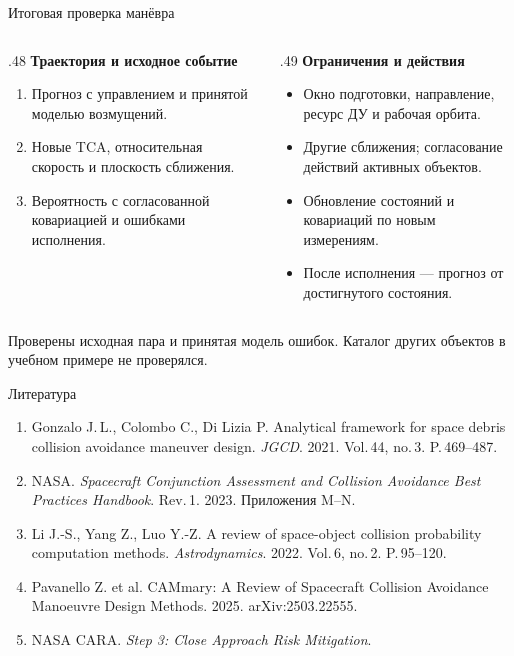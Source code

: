 \documentclass[11pt,aspectratio=169,t]{beamer}
\newcommand{\derivationmathspacing}{%
  \setlength{\abovedisplayskip}{2pt}%
  \setlength{\belowdisplayskip}{3pt}%
  \setlength{\abovedisplayshortskip}{2pt}%
  \setlength{\belowdisplayshortskip}{2pt}%
  \setlength{\jot}{2pt}}
\begin{document}
\begin{frame}{Итоговая проверка манёвра}
\relax\derivationmathspacing
\begin{columns}[T,onlytextwidth]
\begin{column}{.48\textwidth}
\textbf{Траектория и исходное событие}
\begin{enumerate}
\setlength{\itemsep}{5pt}
\item Прогноз с управлением и принятой моделью возмущений.
\item Новые TCA, относительная скорость и плоскость сближения.
\item Вероятность с согласованной ковариацией и ошибками исполнения.
\end{enumerate}
\end{column}
\begin{column}{.49\textwidth}
\textbf{Ограничения и действия}
\begin{itemize}
\setlength{\itemsep}{5pt}
\item Окно подготовки, направление, ресурс ДУ и рабочая орбита.
\item Другие сближения; согласование действий активных объектов.
\item Обновление состояний и ковариаций по новым измерениям.
\item После исполнения --- прогноз от достигнутого состояния.
\end{itemize}
\end{column}
\end{columns}
\smallskip
Проверены исходная пара и принятая модель ошибок. Каталог других объектов в учебном примере не проверялся.
\end{frame}

\begin{frame}{Литература}
\relax\derivationmathspacing
\begin{enumerate}
\setlength{\itemsep}{5pt}
\item Gonzalo J.\,L., Colombo C., Di Lizia P. Analytical framework for space debris collision avoidance maneuver design. \textit{JGCD}. 2021. Vol.\,44, no.\,3. P.\,469--487.
\item NASA. \textit{Spacecraft Conjunction Assessment and Collision Avoidance Best Practices Handbook}. Rev.\,1. 2023. Приложения M--N.
\item Li J.-S., Yang Z., Luo Y.-Z. A review of space-object collision probability computation methods. \textit{Astrodynamics}. 2022. Vol.\,6, no.\,2. P.\,95--120.
\item Pavanello Z. et al. CAMmary: A Review of Spacecraft Collision Avoidance Manoeuvre Design Methods. 2025. arXiv:2503.22555.
\item NASA CARA. \textit{Step 3: Close Approach Risk Mitigation}.
\end{enumerate}
\end{frame}
\end{document}
